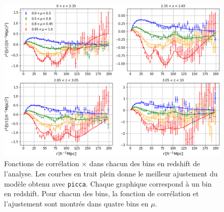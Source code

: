 \documentclass[11pt, twoside, a4paper, openright]{report}
\begin{document}
\begin{figure}
  \centering
  \includegraphics[scale=0.4]{dr16_4bins}
  \caption{Fonctions de corrélation \lya{}$\times$\lya{} dans chacun des bins en redshift de l'analyse. Les courbes en trait plein donne le meilleur ajustement du modèle obtenu avec \texttt{picca}. Chaque graphique correspond à un bin en redshift. Pour chacun des bins, la fonction de corrélation et l'ajustement sont montrés dans quatre bins en $\mu$.}
  \label{fig:dr16_4bins}
\end{figure}
\end{document}
